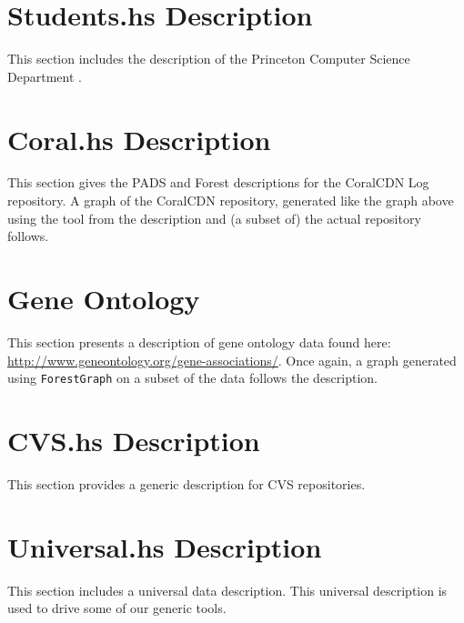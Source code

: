 \documentclass[nocopyrightspace,natbib,onecolumn,9pt]{sigplanconf}
\begin{document}
\section{Students.hs Description}
This section includes the \forest{} description of the Princeton
Computer Science Department \filestore{}.


\newpage

\section{Coral.hs Description}

This section gives the PADS and Forest descriptions for the CoralCDN
Log repository. A graph of the CoralCDN
repository, generated like the graph above using the 
tool from the description and (a subset of) the actual repository 
follows.



\newpage

\section{Gene Ontology}

This section presents a description of gene ontology data found 
here: \url{http://www.geneontology.org/gene-associations/}.
Once again, a graph generated using \texttt{ForestGraph}
on a subset of the data follows the description.



\newpage

\section{CVS.hs Description}

This section provides a generic description for CVS repositories.



\section{Universal.hs Description}

This section includes a universal data description.  This universal description
is used to drive some of our generic tools.


\end{document}
